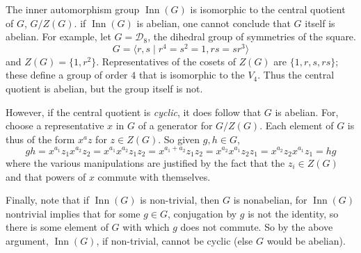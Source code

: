 \documentclass[12pt]{article}
\DeclareMathOperator{\Inn}{Inn}
\newcommand{\cD}{\mathcal{D}}
\begin{document}
The inner automorphism group $\Inn(G)$ is isomorphic to the central quotient of $G$, $G/Z(G)$.  if $\Inn(G)$ is abelian, one cannot conclude that $G$ itself is abelian. For example, let $G=\cD_8$, the dihedral group of symmetries of the square.
\[G=\langle r,s \mid r^4=s^2=1, rs = sr^3\rangle\]
and $Z(G)=\{1,r^2\}$. Representatives of the cosets of $Z(G)$ are $\{1,r,s,rs\}$; these define a group of order $4$ that is isomorphic to the  $V_4$. Thus the central quotient is abelian, but the group itself is not.

However, if the central quotient is \emph{cyclic}, it does follow that $G$ is abelian. For, choose a representative $x$ in $G$ of a generator for $G/Z(G)$. Each element of $G$ is thus of the form $x^az$ for $z\in Z(G)$. So given $g,h\in G$,
\[gh = x^{a_1}z_1x^{a_2}z_2=x^{a_1}x^{a_2}z_1z_2 = x^{a_1+a_2}z_1z_2=x^{a_2}x^{a_1}z_2z_1=x^{a_2}z_2x^{a_1}z_1=hg\]
where the various manipulations are justified by the fact that the $z_i\in Z(G)$ and that powers of $x$ commute with themselves.

Finally, note that if $\Inn(G)$ is non-trivial, then $G$ is nonabelian, for $\Inn(G)$ nontrivial implies that for some $g\in G$, conjugation by $g$ is not the identity, so there is some element of $G$ with which $g$ does not commute. So by the above argument, $\Inn(G)$, if non-trivial, cannot be cyclic (else $G$ would be abelian).
\end{document}
